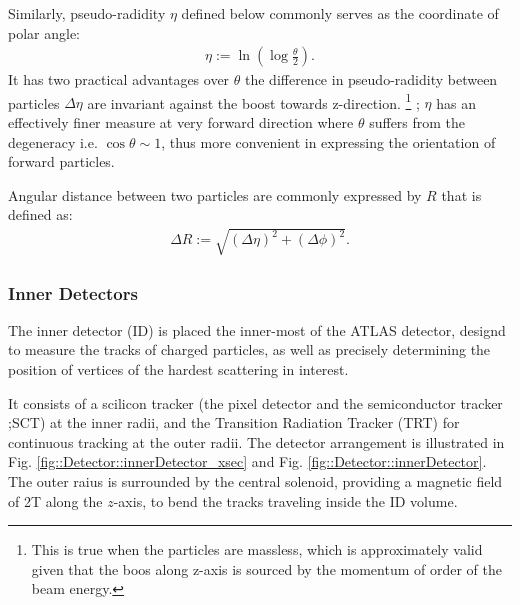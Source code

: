 Similarly, pseudo-radidity $\eta$ defined below commonly serves as the coordinate of polar angle:
\begin{align}
\eta := \ln \left( \log{\frac{\theta}{2}} \right).
\end{align}
It has two practical advantages over $\theta$ the difference in pseudo-radidity between particles $\Delta\eta$ are invariant against the boost towards z-direction. 
\footnote{
This is true when the particles are massless, which is approximately valid given that the boos along z-axis is sourced by the momentum of order of the beam energy.}
; $\eta$ has an effectively finer measure at very forward direction where $\theta$ suffers from the degeneracy i.e. $\cos{\theta}\sim 1$, thus more convenient in expressing the orientation of forward particles.

Angular distance between two particles are commonly expressed by $R$ that is defined as: 
\begin{align}
\Delta R := \sqrt{(\Delta\eta)^2+(\Delta\phi)^2}.
\end{align}



\subsubsection{Inner Detectors}
The inner detector (ID) is placed the inner-most of the ATLAS detector, designd to measure the tracks of charged particles, 
as well as precisely determining the position of vertices of the hardest scattering in interest.

It consists of a scilicon tracker (the pixel detector and the semiconductor tracker ;SCT) at the inner radii,
and the Transition Radiation Tracker (TRT) for continuous tracking at the outer radii. 
The detector arrangement is illustrated in Fig. \ref{fig::Detector::innerDetector_xsec} and Fig. \ref{fig::Detector::innerDetector}.
The outer raius is surrounded by the central solenoid, providing a magnetic field of 2T along the $z$-axis,
to bend the tracks traveling inside the ID volume.

